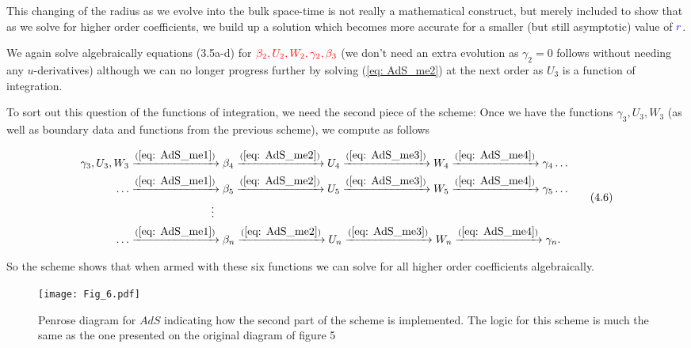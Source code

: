 \documentclass[a4paper,11pt]{article}
\numberwithin{equation}{section}
\begin{document}
This changing of the radius as we evolve into the bulk space-time is not really a mathematical construct, but merely included to show that as we solve for higher order coefficients, we build up a solution which becomes more accurate for a smaller (but still asymptotic) value of $\color{blue}{r}$. \par
 
We again solve algebraically equations (3.5a-d) for $\color{red}{\beta_2, U_2, W_2, \gamma_2, \beta_3}$ (we don't need an extra evolution as $\gamma_2=0$ follows without needing any $u$-derivatives) although we can no longer progress further by solving (\ref{eq: AdS_me2})  at the next order as $U_3$ is a function of integration. \par

 To sort out this question of the functions of integration, we need the second piece of the scheme: Once we have the functions $\gamma_3, U_3, W_3$ (as well as boundary data and functions from the previous scheme), we compute as follows 

\begin{align}
\begin{split}
\gamma_3, U_3, W_3 & \xrightarrow{(\ref{eq: AdS_me1}) } \beta_4 \xrightarrow{(\ref{eq: AdS_me2}) } U_4 \xrightarrow{(\ref{eq: AdS_me3}) } W_4 \xrightarrow{(\ref{eq: AdS_me4}) } \gamma_4 \ldots \\
\ldots & \xrightarrow{(\ref{eq: AdS_me1}) } \beta_5  \xrightarrow{(\ref{eq: AdS_me2}) } U_5 \xrightarrow{(\ref{eq: AdS_me3}) } W_5 \xrightarrow{(\ref{eq: AdS_me4}) } \gamma_5 \ldots \\
&\phantom{aaaaaaaaaaaaaa} \vdots \\
\ldots & \xrightarrow{(\ref{eq: AdS_me1}) } \beta_{n} \xrightarrow{(\ref{eq: AdS_me2}) } U_n \xrightarrow{(\ref{eq: AdS_me3}) } W_n \xrightarrow{(\ref{eq: AdS_me4}) } \gamma_n.
\end{split}
\tag{4.6}
\end{align} 

\noindent So the scheme shows that when armed with these six functions we can solve for all higher order coefficients algebraically. \par

\begin{figure}[H]
\begin{center}
\texttt{[image: Fig\_6.pdf]}
\end{center}
\caption{Penrose diagram for $AdS$ indicating how the second part of the scheme is implemented. The logic for this scheme is much the same as the one presented on the original diagram of figure 5}
\end{figure}
\end{document}
